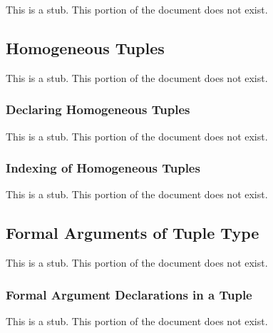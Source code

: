This is a stub.  This portion of the document does not exist.

\subsection{Homogeneous Tuples}
\label{Homogeneous_Tuples}

This is a stub.  This portion of the document does not exist.

\subsubsection{Declaring Homogeneous Tuples}
\label{Declaring_Homogeneous_Tuples}

This is a stub.  This portion of the document does not exist.

\subsubsection{Indexing of Homogeneous Tuples}
\label{Indexing_of_Homogeneous_Tuples}

This is a stub.  This portion of the document does not exist.

\subsection{Formal Arguments of Tuple Type}
\label{Formal_Arguments_of_Tuple_Type}

This is a stub.  This portion of the document does not exist.

\subsubsection{Formal Argument Declarations in a Tuple}
\label{Formal_Argument_Declarations_in_a_Tuple}

This is a stub.  This portion of the document does not exist.
